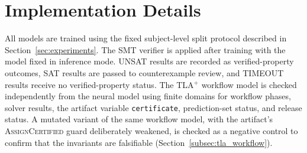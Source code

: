 \documentclass[preprint,11pt]{elsarticle}
\begin{document}
\section{Implementation Details}
\label{app:implementation}
All models are trained using the fixed subject-level split protocol described in Section~\ref{sec:experiments}. The SMT verifier is applied after training with the model fixed in inference mode. UNSAT results are recorded as verified-property outcomes, SAT results are passed to counterexample review, and TIMEOUT results receive no verified-property status. The TLA$^{+}$ workflow model is checked independently from the neural model using finite domains for workflow phases, solver results, the artifact variable \texttt{certificate}, prediction-set status, and release status. A mutated variant of the same workflow model, with the artifact's \textsc{AssignCertified} guard deliberately weakened, is checked as a negative control to confirm that the invariants are falsifiable (Section~\ref{subsec:tla_workflow}).
\end{document}
